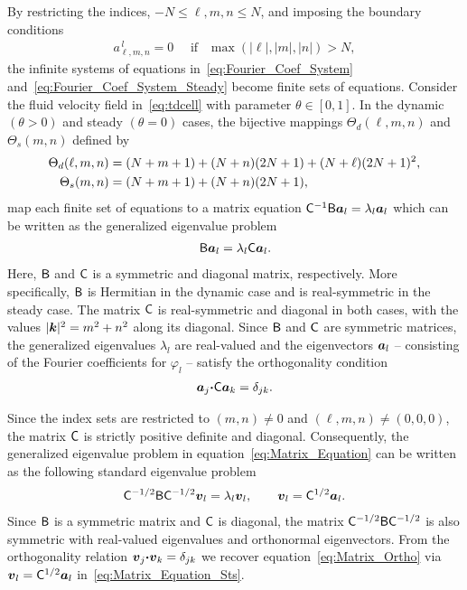 \documentclass[amsa]{ipart}
\begin{document}
By restricting the indices, $-N\leq \ell,m,n\leq N$, and imposing the boundary
conditions
%
\begin{align}
  a^{\,l}_{\ell,m,n}=0 \quad \text{ if } \ \ \max(|\ell|,|m|,|n|)>N,
\end{align}
%
the infinite systems of equations in~\eqref{eq:Fourier_Coef_System}
and~\eqref{eq:Fourier_Coef_System_Steady} become finite sets of
equations. Consider the fluid velocity field in~\eqref{eq:tdcell} with
parameter $\theta\in[0,1]$. In the dynamic $(\theta>0)$ and steady $(\theta=0)$ cases,
the bijective mappings $\Theta_d(\ell,m,n)$ and $\Theta_s(m,n)$ defined by 
%
\begin{align}\label{eq:Bijections}
  \Theta_d(\ell,m,n)&=(N+m+1)+(N+n)(2N+1)+(N+\ell)(2N+1)^2,
  \\
  \Theta_s(m,n)&=(N+m+1)+(N+n)(2N+1),
  \notag
\end{align}
%
map each finite set of equations to a matrix equation
$\mathsf{C}^{-1}\mathsf{B}\boldsymbol{a}_l=\lambda_l\boldsymbol{a}_l$ which can be written as the
generalized eigenvalue problem   
%
\begin{align}\label{eq:Matrix_Equation}
  \Bm\veca_l=\lambda_l \Cm\veca_l.
\end{align}
%
Here, $\mathsf{B}$ and $\mathsf{C}$ is a symmetric and diagonal matrix,
respectively. More specifically, $\mathsf{B}$ is Hermitian in the dynamic
case and is real-symmetric in the steady case. The matrix $\mathsf{C}$ is
real-symmetric and diagonal in both cases, with the values
$|\boldsymbol{k}|^2=m^2+n^2$ along its diagonal. Since $\mathsf{B}$ and $\mathsf{C}$ are
symmetric matrices, the generalized eigenvalues $\lambda_l$ are real-valued
and the eigenvectors $\boldsymbol{a}_l$ -- consisting of the Fourier
coefficients for $\varphi_l$ -- satisfy the orthogonality
condition~\cite{Parlett:1980}     
%
\begin{align}\label{eq:Matrix_Ortho}
  \veca_j\bcdot\Cm\veca_k=\delta_{jk}.
\end{align}
%




Since the index sets are restricted to $(m,n)\neq0$ and
$(\ell,m,n)\neq(0,0,0)$, the matrix $\mathsf{C}$ is strictly positive definite and
diagonal. Consequently, the generalized eigenvalue problem in
equation~\eqref{eq:Matrix_Equation} can be written as the following
standard eigenvalue problem 
%
\begin{align}\label{eq:Matrix_Equation_Sts}
  \Cm^{-1/2}\Bm\Cm^{-1/2}\vecv_l=\lambda_l\vecv_l,
  \qquad
  \vecv_l=\Cm^{1/2}\veca_l.
\end{align}
%
Since $\mathsf{B}$ is a symmetric matrix and $\mathsf{C}$ is diagonal, the matrix
$\mathsf{C}^{-1/2}\mathsf{B}\mathsf{C}^{-1/2}$ is also symmetric with real-valued
eigenvalues and orthonormal eigenvectors. From the
orthogonality relation $\boldsymbol{v}_j\mbox{\boldmath${\cdot}$}\boldsymbol{v}_k=\delta_{jk}$ we recover
equation~\eqref{eq:Matrix_Ortho} via $\boldsymbol{v}_l=\mathsf{C}^{1/2}\boldsymbol{a}_l$
in~\eqref{eq:Matrix_Equation_Sts}. 
\end{document}
